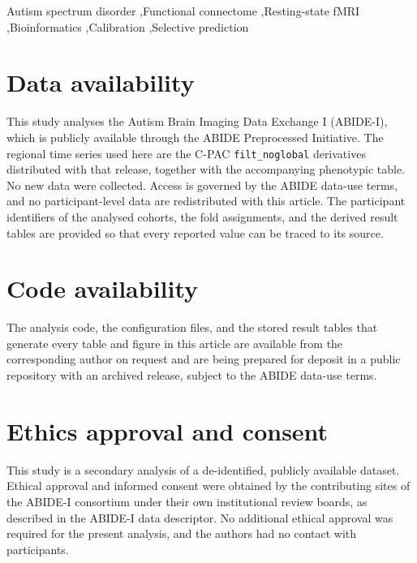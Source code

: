 \documentclass[a4paper,fleqn]{cas-sc}
\begin{document}
\begin{keywords}
Autism spectrum disorder \sep Functional connectome \sep Resting-state fMRI \sep Bioinformatics \sep Calibration \sep Selective prediction
\end{keywords}

\maketitle








\section*{Data availability}
This study analyses the Autism Brain Imaging Data Exchange I (ABIDE-I), which is publicly
available through the ABIDE Preprocessed Initiative. The regional time series used here are the
C-PAC \texttt{filt\_noglobal} derivatives distributed with that release, together with the
accompanying phenotypic table. No new data were collected. Access is governed by the ABIDE
data-use terms, and no participant-level data are redistributed with this article. The
participant identifiers of the analysed cohorts, the fold assignments, and the derived result
tables are provided so that every reported value can be traced to its source.

\section*{Code availability}
The analysis code, the configuration files, and the stored result tables that generate every
table and figure in this article are available from the corresponding author on request and are
being prepared for deposit in a public repository with an archived release, subject to the
ABIDE data-use terms.

\section*{Ethics approval and consent}
This study is a secondary analysis of a de-identified, publicly available dataset. Ethical
approval and informed consent were obtained by the contributing sites of the ABIDE-I
consortium under their own institutional review boards, as described in the ABIDE-I data
descriptor. No additional ethical approval was required for the present analysis, and the
authors had no contact with participants.
\end{document}
